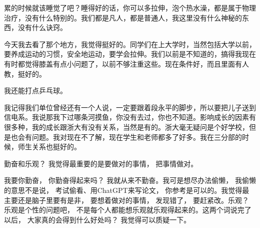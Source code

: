 

累的时候就该睡觉了吧？睡得好的话，你可以多拉伸，泡个热水澡，都是属于物理治疗，没有什么特别的。我们都是凡人，都是普通人，我这里没有什么神秘的东西，没有什么诀窍。


今天我去看了那个地方，我觉得挺好的。同学们在上大学时，当然包括大学以前，要养成运动的习惯，安全地运动，要学会拉伸。我们以前是不知道的，搞得我现在有时都觉得膝盖有点小问题了，以前不够注重这些。现在条件好，而且里面有人教，挺好的。


我还能打点乒乓球。



我记得我们单位曾经还有一个人说，一定要跟着段永平的脚步，所以要把儿子送到信电系。我说那我下过哪条河摸鱼，你没有去过，你也不知道。影响成长的因素有很多种，我的成长跟浙大有没有关系，当然是有的。浙大毫无疑问是个好学校，但是也会有问题。我对现在不了解，现在学生和老师都多了好多。我在三分部的时候，师生关系也挺好的。


勤奋和乐观？ 我觉得最重要的是要做对的事情， 把事情做对。

我要你勤奋， 你勤奋得起来吗？ 我就从来不勤奋。我可是想尽办法偷懒， 我偷懒的意思不是说， 考试偷看、用ChatGPT来写论文， 你参考是可以的。我觉得最主要还是脑子里要有是非， 要想着做对的事情， 发现错了， 要赶紧改。乐观？ 乐观是个性的问题吧， 不是每个人都能想乐观就乐观得起来的。这两个词说完了以后， 大家真的会得到什么好处吗？ 我觉得可以质疑一下。



